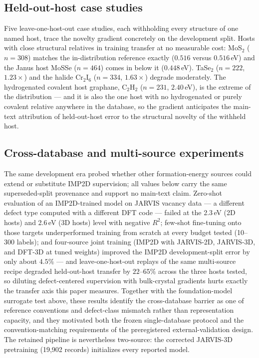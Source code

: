 \documentclass[aps,prb,onecolumn,superscriptaddress,floatfix]{revtex4-2}
\begin{document}
\subsection{Held-out-host case studies}

Five leave-one-host-out case studies, each withholding every structure of
one named host, trace the novelty gradient concretely on the development
split.  Hosts with close structural relatives in training transfer at no
measurable cost: MoS$_2$ ($n=308$) matches the in-distribution reference
exactly ($0.516$ versus $0.516$\,eV) and the Janus host MoSSe ($n=464$)
comes in below it ($0.448$\,eV).  TaSe$_2$ ($n=222$, $1.23\times$) and
the halide Cr$_2$I$_6$ ($n=334$, $1.63\times$) degrade moderately.  The
hydrogenated covalent host graphane, C$_2$H$_2$ ($n=231$, $2.40$\,eV), is
the extreme of the distribution --- and it is also the one host with no
hydrogenated or purely covalent relative anywhere in the database, so the
gradient anticipates the main-text attribution of held-out-host error to
the structural novelty of the withheld host.

\subsection{Cross-database and multi-source experiments}

The same development era probed whether other formation-energy sources
could extend or substitute IMP2D supervision; all values below carry the
same superseded-split provenance and support no main-text claim.
Zero-shot evaluation of an IMP2D-trained model on JARVIS vacancy data ---
a different defect type computed with a different DFT code --- failed at
the 2.3\,eV (2D hosts) and 2.6\,eV (3D hosts) level with negative
$R^2$; few-shot fine-tuning onto those targets underperformed training
from scratch at every budget tested (10--300 labels); and four-source
joint training (IMP2D with JARVIS-2D, JARVIS-3D, and DFT-3D at tuned
weights) improved the IMP2D development-split error by only about
$4.5\%$ --- and leave-one-host-out replays of the same multi-source
recipe degraded held-out-host transfer by $22$--$65\%$ across the three
hosts tested, so diluting defect-centered supervision with bulk-crystal
gradients hurts exactly the transfer axis this paper measures.  Together
with the foundation-model surrogate test above, these
results identify the cross-database barrier as one of reference
conventions and defect-class mismatch rather than representation capacity,
and they motivated both the frozen single-database protocol and the
convention-matching requirements of the preregistered external-validation
design.  The retained pipeline is nevertheless two-source: the corrected
JARVIS-3D pretraining (19{,}902 records) initializes every reported model.
\end{document}
